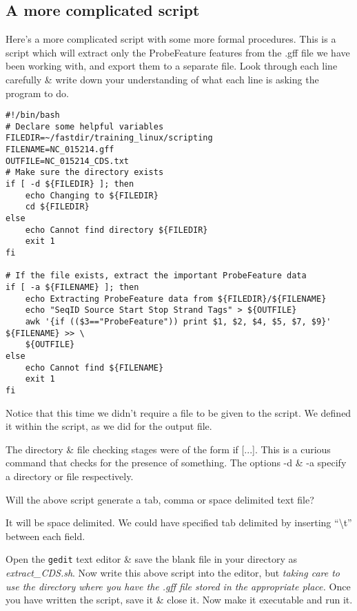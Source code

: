 \subsection*{A more complicated script}

Here's a more complicated script with some more formal procedures.
This is a script which will extract only the ProbeFeature features from the .gff file we have been working
with, and export them to a separate file.
Look through each line carefully \& write down your understanding of what each line is asking the
program to do.

\begin{lstlisting}[style=command_syntax]
#!/bin/bash
# Declare some helpful variables
FILEDIR=~/fastdir/training_linux/scripting
FILENAME=NC_015214.gff
OUTFILE=NC_015214_CDS.txt
# Make sure the directory exists
if [ -d ${FILEDIR} ]; then
	echo Changing to ${FILEDIR}
	cd ${FILEDIR}
else
	echo Cannot find directory ${FILEDIR}
	exit 1
fi

# If the file exists, extract the important ProbeFeature data
if [ -a ${FILENAME} ]; then
	echo Extracting ProbeFeature data from ${FILEDIR}/${FILENAME}
	echo "SeqID Source Start Stop Strand Tags" > ${OUTFILE}
	awk '{if (($3=="ProbeFeature")) print $1, $2, $4, $5, $7, $9}' ${FILENAME} >> \
	${OUTFILE}
else
	echo Cannot find ${FILENAME}
	exit 1
fi

\end{lstlisting}

Notice that this time we didn't require a file to be given to the script.
We defined it within the script, as we did for the output file.

\begin{information}
The directory \& file checking stages were of the form if [...].
This is a curious command that checks for the presence of something. 
The options -d \& -a specify a directory or file respectively.
\end{information}

\begin{questions}
Will the above script generate a tab, comma or space delimited text file? \\
\begin{answer}
It will be space delimited. 
We could have specified tab delimited by inserting ``\textbackslash t'' between each field.
\end{answer}
\end{questions}

\begin{steps}
Open the \texttt{gedit} text editor \& save the blank file in your directory as
\textit{extract\_CDS.sh}.
Now write this above script into the editor, but \textit{taking care to use the directory where you
have the .gff file stored in the appropriate place.}
Once you have written the script, save it \& close it.
Now make it executable and run it.\\
\end{steps}


